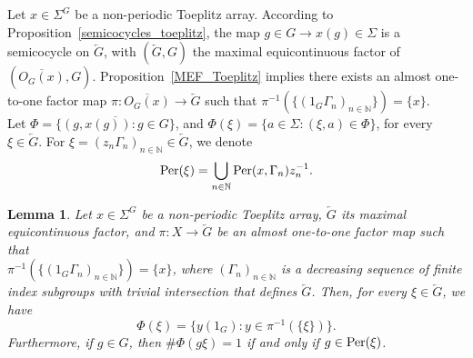\documentclass[titlepage,reqno,10pt]{amsart}
\newtheorem{lemma}[theorem]{Lemma}
\theoremstyle{definition}
\def\Per{{\rm Per}}
\begin{document}
Let $x\in\Sigma^G$ be a non-periodic Toeplitz array. According to Proposition~\ref{semicocycles_toeplitz}, the map $g\in G\to x(g)\in\Sigma$ is a semicocycle on $\overleftarrow{G}$, with $(\overleftarrow{G},G)$ the maximal equicontinuous factor of $(\overline{O_G(x)},G)$. Proposition~\ref{MEF_Toeplitz} implies there exists an almost one-to-one factor map  $\pi:\overline{O_G(x)}\to \overleftarrow{G}$ such that $\pi^{-1}\left(\{(1_G\Gamma_n)_{n\in\mathbb{N}}\}\right)=\{x\}$.\\
Let $\Phi=\overline{\{(g,x(g)):g\in G\}}$, and $\Phi(\xi) = \{a\in \Sigma:(\xi,a)\in \Phi\}$, for every $\xi\in \overleftarrow{G}$.   
For $\xi=(z_n\Gamma_n)_{n\in\mathbb{N}}\in \overleftarrow{G}$, we denote
$$
\Per(\xi)=\bigcup_{n\in\mathbb{N}}\Per(x,\Gamma_n)z_n^{-1}.
$$

\begin{lemma}\label{Characterization_Phi}
Let $x\in \Sigma^G$ be a non-periodic Toeplitz array, $\overleftarrow{G}$ its maximal equicontinuous factor, and $\pi:X\to \overleftarrow{G}$ be an almost one-to-one factor map such that\\ $\pi^{-1}\left(\{(1_G\Gamma_n)_{n\in\mathbb{N}}\}\right)=\{x\}$, where $(\Gamma_n)_{n\in\mathbb{N}}$ is a decreasing sequence of finite index subgroups with trivial intersection that defines $\overleftarrow{G}$. 
Then, for every $\xi\in \overleftarrow{G}$, we have 
$$
 \Phi(\xi)=\{y(1_G): y\in \pi^{-1}(\{\xi\})\}. 
$$
Furthermore, if $g\in G$, then $\#\Phi(g\xi)=1$ if and only if $g \in \Per(\xi)$.

\end{lemma}
\end{document}
